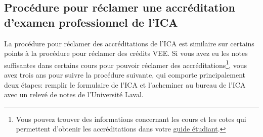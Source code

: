 \subsection*{Procédure pour réclamer une accréditation d'examen professionnel de l'ICA}
\label{subsec:reclamaccredit}

La procédure pour réclamer des accréditations de l'ICA est similaire sur certains points à la procédure pour réclamer des crédits VEE. Si vous avez eu les notes suffisantes dans certains cours pour pouvoir réclamer des accréditations\footnote{Vous pouvez trouver des informations concernant les cours et les cotes qui permettent d'obtenir les accréditations dans votre \href{https://www.act.ulaval.ca/programmes-et-cours/premier-cycle/guide-de-letudiant/}{guide étudiant}.}, vous avez trois ans pour suivre la procédure suivante, qui comporte principalement deux étapes: remplir le formulaire de l'ICA et l'acheminer au bureau de l'ICA avec un relevé de notes de l'Université Laval.\vspace{\baselineskip} 

